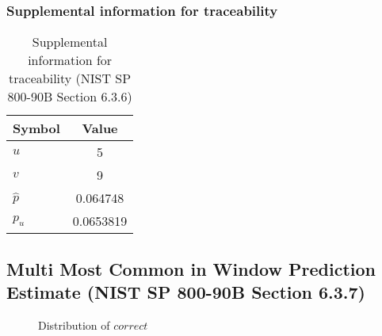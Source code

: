\documentclass[a3paper,xelatex,english]{bxjsarticle}
\begin{document}
\subsubsection{Supplemental information for traceability}
\renewcommand{\arraystretch}{1.8}
\begin{table}[h]
\caption{Supplemental information for traceability (NIST SP 800-90B Section 6.3.6)}
\begin{center}
\begin{tabular}{|l|c|}
\hline 
\rowcolor{anotherlightblue} %
Symbol				& Value \\ \hline 
$u$				&        5\\ \hline 
$v$				&        9\\ \hline 
$\hat{p}$ 			& 0.064748\\ \hline
$p_u$				& 0.0653819\\ \hline
\end{tabular}
\end{center}
\end{table}
\renewcommand{\arraystretch}{1.4}
\clearpage
\subsection{Multi Most Common in Window Prediction Estimate (NIST SP 800-90B Section 6.3.7)}\label{sec:NonBinary637}

\begin{figure}[htbp]
\centering

\caption{Distribution of $correct$}
\end{figure}
\end{document}
